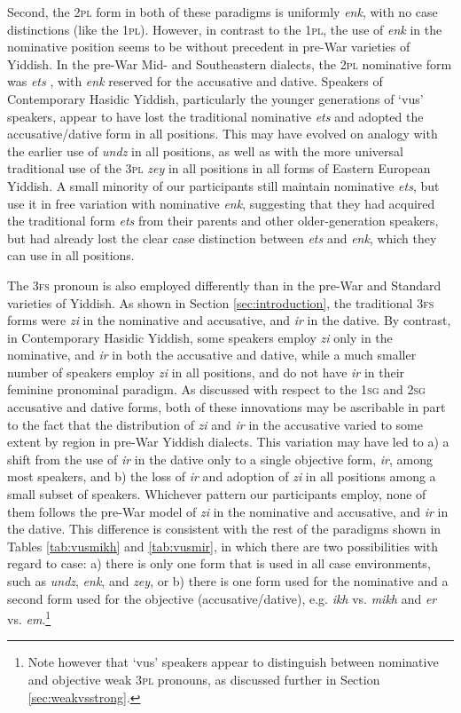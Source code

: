 \documentclass[output=paper, hidelinks]{langscibook}
\begin{document}
Second, the 2\textsc{pl} form in both of these paradigms is uniformly \textit{enk}, with no case distinctions (like the 1\textsc{pl}). However, in contrast to the 1\textsc{pl}, the use of \textit{enk} in the nominative position seems to be without precedent in pre-War varieties of Yiddish. In the pre-War Mid- and Southeastern dialects, the 2\textsc{pl} nominative form was \textit{ets} \citep[70]{Jacobs05}, with \textit{enk} reserved for the accusative and dative. Speakers of Contemporary Hasidic Yiddish, particularly the younger generations of ‘vus’ speakers, appear to have lost the traditional nominative \textit{ets} and adopted the accusative/dative form in all positions. This may have evolved on analogy with the earlier use of \textit{undz} in all positions, as well as with the more universal traditional use of the 3\textsc{pl} \textit{zey} in all positions in all forms of Eastern European Yiddish. A small minority of our participants still maintain nominative \textit{ets}, but use it in free variation with nominative \textit{enk}, suggesting that they had acquired the traditional form \textit{ets} from their parents and other older-generation speakers, but had already lost the clear case distinction between \textit{ets} and \textit{enk}, which they can use in all positions. 

The 3\textsc{fs} pronoun is also employed differently than in the pre-War and Standard varieties of Yiddish. As shown in Section \ref{sec:introduction}, the traditional 3\textsc{fs} forms were \textit{zi} in the nominative and accusative, and \textit{ir} in the dative. By contrast, in Contemporary Hasidic Yiddish, some speakers employ \textit{zi} only in the nominative, and \textit{ir} in both the accusative and dative, while a much smaller number of speakers employ \textit{zi} in all positions, and do not have \textit{ir} in their feminine pronominal paradigm. As discussed with respect to the 1\textsc{sg} and 2\textsc{sg} accusative and dative forms, both of these innovations may be ascribable in part to the fact that the distribution of \textit{zi} and \textit{ir} in the accusative varied to some extent by region in pre-War Yiddish dialects. This variation may have led to a) a shift from the use of \textit{ir} in the dative only to a single objective form, \textit{ir}, among most speakers, and b) the loss of \textit{ir} and adoption of \textit{zi} in all positions among a small subset of speakers. Whichever pattern our participants employ, none of them follows the pre-War model of \textit{zi} in the nominative and accusative, and \textit{ir} in the dative. This difference is consistent with the rest of the paradigms shown in Tables \ref{tab:vusmikh} and \ref{tab:vusmir}, in which there are two possibilities with regard to case: a) there is only one form that is used in all case environments, such as \textit{undz}, \textit{enk}, and \textit{zey}, or b) there is one form used for the nominative and a second form used for the objective (accusative/dative), e.g. \textit{ikh} vs. \textit{mikh} and \textit{er} vs. \textit{em}.\footnote{Note however that `vus' speakers appear to distinguish between nominative and objective weak 3\textsc{pl} pronouns, as discussed further in Section \ref{sec:weakvsstrong}.}
\end{document}
